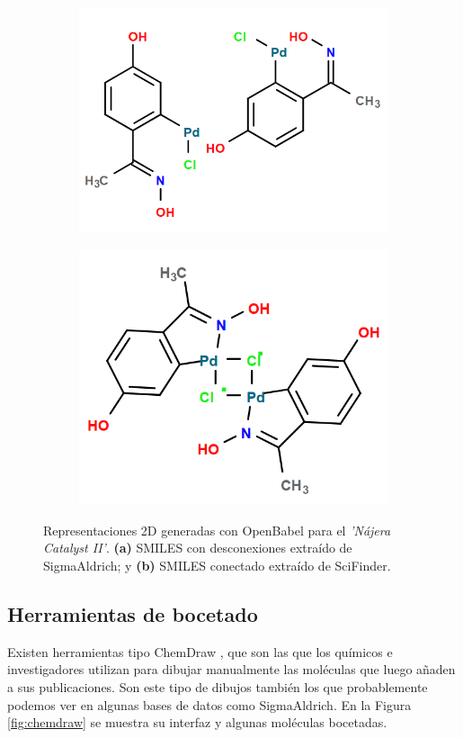 \begin{figure}[h!]
\centering
\begin{subfigure}{.5\textwidth}
  \centering
  \includegraphics[width=.9\linewidth, frame]{imagenes/estado_arte/dotted_SA.png}
  \caption{}
  \label{fig:sub1}
\end{subfigure}%
\begin{subfigure}{.5\textwidth}
  \centering
  \includegraphics[width=.8\linewidth, frame]{imagenes/estado_arte/not_dotted_SF.png}
  \caption{}
  \label{fig:sub2}
\end{subfigure}
\caption{Representaciones 2D generadas con OpenBabel para el \emph{'Nájera Catalyst II'}. \textbf{(a)} SMILES con desconexiones extraído de SigmaAldrich; y \textbf{(b)} SMILES conectado extraído de SciFinder.}
\label{fig:dotted_smiles_vs_complete}
\end{figure}


\subsection{Herramientas de bocetado}
Existen herramientas tipo ChemDraw \cite{chemdraw_page}, que son las que los químicos e investigadores utilizan para dibujar manualmente las moléculas que luego añaden a sus publicaciones. Son este tipo de dibujos también los que probablemente podemos ver en algunas bases de datos como SigmaAldrich. En la Figura \ref{fig:chemdraw} se muestra su interfaz y algunas moléculas bocetadas.

